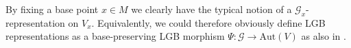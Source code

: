 \documentclass[reqno,a4paper,oneside]{amsart}
\theoremstyle{plain}
\theoremstyle{remark}
\newtheorem{remark}[theorem]{Remarks}
\theoremstyle{definition}
\def\bas#1\eas{\begin{align*}#1\end{align*}}
\begin{document}

By fixing a base point $x \in M$ we clearly have the typical notion of a $\mathcal{G}_x$-representation on $V_x$. Equivalently, we could therefore obviously define LGB representations as a base-preserving LGB morphism $\Psi: \mathcal{G} \to \mathrm{Aut}(V)$ as also in \cite[\S 1.7, Def.\ 1.7.1, page 43]{mackenzieGeneralTheory}.
\end{document}
